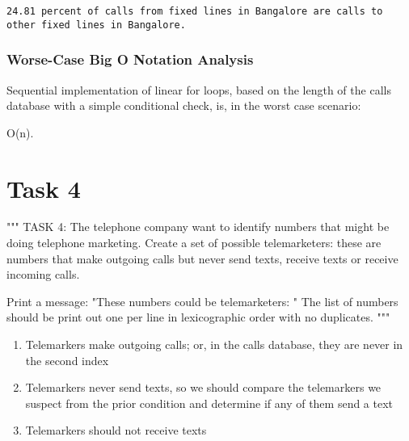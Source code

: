 \documentclass[11pt]{article}
\providecommand{\tightlist}{%
      \setlength{\itemsep}{0pt}\setlength{\parskip}{0pt}}
\begin{document}
    \begin{Verbatim}[commandchars=\\\{\}]
24.81 percent of calls from fixed lines in Bangalore are calls to other fixed lines in Bangalore.

    \end{Verbatim}

    \subsubsection{Worse-Case Big O Notation
Analysis}\label{worse-case-big-o-notation-analysis}

    Sequential implementation of linear for loops, based on the length of
the calls database with a simple conditional check, is, in the worst
case scenario:

O(n).

    \section{Task 4}\label{task-4}

    """ TASK 4: The telephone company want to identify numbers that might be
doing telephone marketing. Create a set of possible telemarketers: these
are numbers that make outgoing calls but never send texts, receive texts
or receive incoming calls.

Print a message: "These numbers could be telemarketers: " The list of
numbers should be print out one per line in lexicographic order with no
duplicates. """

    \begin{enumerate}
\def\labelenumi{\arabic{enumi}.}
\tightlist
\item
  Telemarkers make outgoing calls; or, in the calls database, they are
  never in the second index
\item
  Telemarkers never send texts, so we should compare the telemarkers we
  suspect from the prior condition and determine if any of them send a
  text
\item
  Telemarkers should not receive texts
\end{enumerate}
\end{document}
